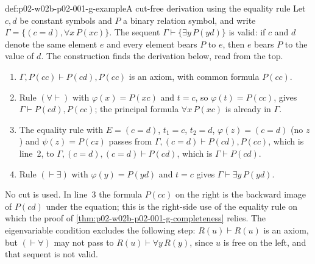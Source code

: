 \begin{hbexample}{def:p02-w02b-p02-001-g-example}{A cut-free derivation using the equality rule}
Let \(c,d\) be constant symbols and \(P\) a binary relation symbol, and
write \(\Gamma=\{(c=d),\forall x\,P(xc)\}\).  The sequent
\(\Gamma\vdash\{\exists y\,P(yd)\}\) is valid: if \(c\) and \(d\) denote the
same element \(e\) and every element bears \(P\) to \(e\), then \(e\) bears
\(P\) to the value of \(d\).  The construction finds the derivation below,
read from the top.
\begin{enumerate}
\item \(\Gamma,P(cc)\vdash P(cd),P(cc)\) is an axiom, with common formula
      \(P(cc)\).
\item Rule \((\forall\vdash)\) with \(\varphi(x)=P(xc)\) and \(t=c\), so
      \(\varphi(t)=P(cc)\), gives \(\Gamma\vdash P(cd),P(cc)\); the
      principal formula \(\forall x\,P(xc)\) is already in \(\Gamma\).
\item The equality rule with \(E=(c=d)\), \(t_1=c\), \(t_2=d\),
      \(\varphi(z)=(c=d)\) (no \(z\)) and \(\psi(z)=P(cz)\) passes from
      \(\Gamma,(c=d)\vdash P(cd),P(cc)\), which is line~2, to
      \(\Gamma,(c=d),(c=d)\vdash P(cd)\), which is \(\Gamma\vdash P(cd)\).
\item Rule \((\vdash\exists)\) with \(\varphi(y)=P(yd)\) and \(t=c\) gives
      \(\Gamma\vdash\exists y\,P(yd)\).
\end{enumerate}
No cut is used.  In line~3 the formula \(P(cc)\) on the right is the
backward image of \(P(cd)\) under the equation; this is the right-side use
of the equality rule on which the proof of
\cref{thm:p02-w02b-p02-001-g-completeness} relies.  The eigenvariable
condition excludes the following step: \(R(u)\vdash R(u)\) is an axiom, but
\((\vdash\forall)\) may not pass to \(R(u)\vdash\forall y\,R(y)\), since
\(u\) is free on the left, and that sequent is not valid.
\end{hbexample}

